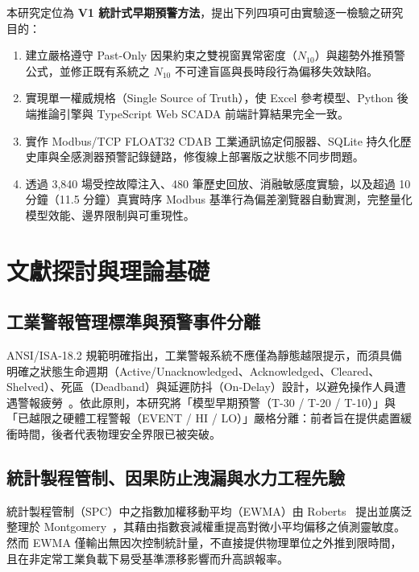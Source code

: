 \documentclass[fontset=none, a4paper, 12pt]{ctexart}
\begin{document}
\begin{doublespace}
本研究定位為 \textbf{V1 統計式早期預警方法}，提出下列四項可由實驗逐一檢驗之研究目的：
\begin{enumerate}
    \item 建立嚴格遵守 Past-Only 因果約束之雙視窗異常密度（$N_{10}$）與趨勢外推預警公式，並修正既有系統之 $N_{10}$ 不可達盲區與長時段行為偏移失效缺陷。
    \item 實現單一權威規格（Single Source of Truth），使 Excel 參考模型、Python 後端推論引擎與 TypeScript Web SCADA 前端計算結果完全一致。
    \item 實作 Modbus/TCP FLOAT32 CDAB 工業通訊協定伺服器、SQLite 持久化歷史庫與全感測器預警記錄鏈路，修復線上部署版之狀態不同步問題。
    \item 透過 3,840 場受控故障注入、480 筆歷史回放、消融敏感度實驗，以及超過 10 分鐘（11.5 分鐘）真實時序 Modbus 基準行為偏差瀏覽器自動實測，完整量化模型效能、邊界限制與可重現性。
\end{enumerate}

\clearpage
\section{文獻探討與理論基礎}

\subsection{工業警報管理標準與預警事件分離}
ANSI/ISA-18.2 規範明確指出，工業警報系統不應僅為靜態越限提示，而須具備明確之狀態生命週期（Active/Unacknowledged、Acknowledged、Cleared、Shelved）、死區（Deadband）與延遲防抖（On-Delay）設計，以避免操作人員遭遇警報疲勞~\cite{isa1822016}。依此原則，本研究將「模型早期預警（T-30 / T-20 / T-10）」與「已越限之硬體工程警報（EVENT / HI / LO）」嚴格分離：前者旨在提供處置緩衝時間，後者代表物理安全界限已被突破。

\subsection{統計製程管制、因果防止洩漏與水力工程先驗}
統計製程管制（SPC）中之指數加權移動平均（EWMA）由 Roberts~\cite{roberts1959control} 提出並廣泛整理於 Montgomery~\cite{montgomery2020statistical}，其藉由指數衰減權重提高對微小平均偏移之偵測靈敏度。然而 EWMA 僅輸出無因次控制統計量，不直接提供物理單位之外推到限時間，且在非定常工業負載下易受基準漂移影響而升高誤報率。


\end{doublespace}
\end{document}
